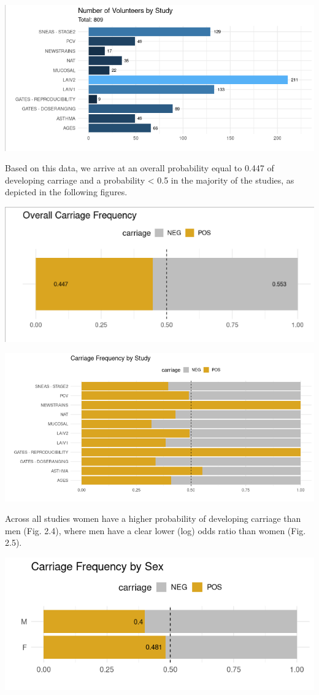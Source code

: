 \documentclass[
]{book}
\begin{document}
\includegraphics[width=11.19in]{images/paste-1E7F5309}

Based on this data, we arrive at an overall probability equal to 0.447 of developing carriage and a probability \textless{} 0.5 in the majority of the studies, as depicted in the following figures.

\includegraphics[width=8.19in]{images/paste-10E686C0}

\includegraphics[width=12.4in]{images/paste-CA5BC0AE}

Across all studies women have a higher probability of developing carriage than men (Fig. 2.4), where men have a clear lower (log) odds ratio than women (Fig. 2.5).

\includegraphics[width=9.33in]{images/paste-3446DB5C}
\end{document}
